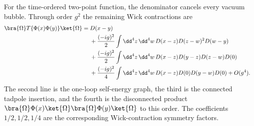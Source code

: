 \begin{enumerate}
For the time-ordered two-point function, the denominator cancels every
vacuum bubble.  Through order \(g^2\) the remaining Wick contractions are
\[
 \begin{split}
 \bra{\Omega}T\{\Phi(x)\Phi(y)\}\ket{\Omega}
 ={}&D(x-y)\\
 &+\frac{(-ig)^2}{2}\int \dd^4z\,\dd^4w\,
 D(x-z)D(z-w)^2D(w-y)\\
 &+\frac{(-ig)^2}{2}\int \dd^4z\,\dd^4w\,
 D(x-z)D(y-z)D(z-w)D(0)\\
 &+\frac{(-ig)^2}{4}\int \dd^4z\,\dd^4w\,
 D(x-z)D(0)D(y-w)D(0)+O(g^4).
 \end{split}
\]
The second line is the one-loop self-energy graph, the third is the
connected tadpole insertion, and the fourth is the disconnected product
\(\bra{\Omega}\Phi(x)\ket{\Omega}
 \bra{\Omega}\Phi(y)\ket{\Omega}\) to this order.  The coefficients
\(1/2,1/2,1/4\) are the corresponding Wick-contraction symmetry factors.
\end{enumerate}
